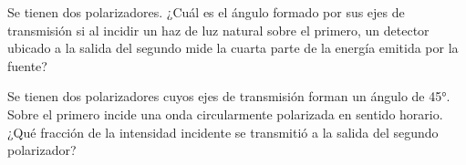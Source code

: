 \item 
Se tienen dos polarizadores.
¿Cuál es el ángulo formado por sus ejes de transmisión si al incidir un haz de luz natural sobre el primero, un detector ubicado a la salida del segundo mide la cuarta parte de la energía emitida por la fuente?



\item Se tienen dos polarizadores cuyos ejes de transmisión forman un ángulo de \ang{45;;}.
Sobre el primero incide una onda circularmente polarizada en sentido horario.
¿Qué fracción de la intensidad incidente se transmitió a la salida del segundo polarizador?
